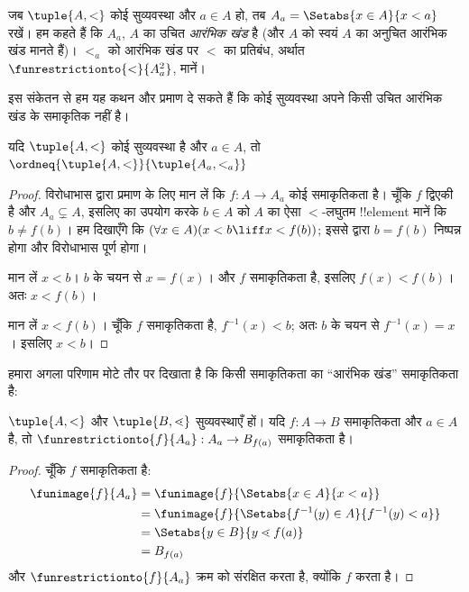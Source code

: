 \documentclass[../../../include/open-logic-section]{subfiles}
\begin{document}
\begin{defn}
जब $\tuple{A, <}$ कोई सुव्यवस्था और $a \in A$ हो, तब
$A_a = \Setabs{x \in A}{x < a}$ रखें। हम कहते हैं कि $A_a$, $A$ का उचित
\emph{आरंभिक खंड} है (और $A$ को स्वयं $A$ का अनुचित आरंभिक खंड मानते हैं)।
$<_a$ को आरंभिक खंड पर $<$ का प्रतिबंध, अर्थात
$\funrestrictionto{\mathord{<}}{A_a^2}$, मानें।
\end{defn}
\noindent
इस संकेतन से हम यह कथन और प्रमाण दे सकते हैं कि कोई सुव्यवस्था अपने किसी
उचित आरंभिक खंड के समाकृतिक नहीं है।

\begin{lem}
यदि $\tuple{A, <}$ कोई सुव्यवस्था है और $a \in A$, तो
$\ordneq{\tuple{A, <}}{\tuple{A_a, <_a}}$ 
\end{lem}

\begin{proof}
विरोधाभास द्वारा प्रमाण के लिए मान लें कि $f \colon A \to A_a$ कोई
समाकृतिकता है। चूँकि $f$ द्विएकी है और $A_a \subsetneq A$, इसलिए
 का उपयोग करके $b \in A$ को $A$ का ऐसा
$<$-लघुतम !!{element} मानें कि $b \neq f(b)$। हम दिखाएँगे कि
$(\forall x \in A)(x<b \liff x < f(b))$; इससे
 द्वारा
$b = f(b)$ निष्पन्न होगा और विरोधाभास पूर्ण होगा।

मान लें $x < b$। $b$ के चयन से $x = f(x)$। और $f$ समाकृतिकता है, इसलिए
$f(x) < f(b)$। अतः $x < f(b)$।

मान लें $x < f(b)$। चूँकि $f$ समाकृतिकता है, $f^{-1}(x) < b$; अतः $b$ के
चयन से $f^{-1}(x) = x$। इसलिए $x < b$।
\end{proof}

हमारा अगला परिणाम मोटे तौर पर दिखाता है कि किसी समाकृतिकता का ``आरंभिक
खंड'' समाकृतिकता है:

\begin{lem}
$\tuple{A, <}$ और $\tuple{B, \lessdot}$ सुव्यवस्थाएँ हों। यदि
$f \colon A \to B$ समाकृतिकता और $a \in A$ है, तो
$\funrestrictionto{f}{A_{a}} : A_a \to B_{f(a)}$ समाकृतिकता है।
\end{lem}

\begin{proof}
चूँकि $f$ समाकृतिकता है:
\begin{align*}
	\funimage{f}{A_a} &= \funimage{f}{\Setabs{x \in A}{x < a}}\\
	&= \funimage{f}{\Setabs{f^{-1}(y) \in A}{f^{-1}(y) < a}} \\
	&= \Setabs{y \in B}{y \lessdot f(a)} \\
	&=B_{f(a)} 
\end{align*}
और $\funrestrictionto{f}{A_a}$ क्रम को संरक्षित करता है, क्योंकि $f$ करता
है।
\end{proof}
\end{document}
